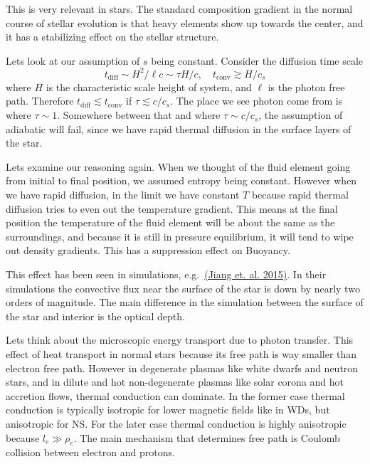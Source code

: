 \documentclass[letterpaper, 11pt]{article}
\numberwithin{equation}{section}
\numberwithin{figure}{section}
\begin{document}
This is very relevant in stars. The standard composition gradient in the normal
course of stellar evolution is that heavy elements show up towards the center,
and it has a stabilizing effect on the stellar structure.

Lets look at our assumption of $s$ being constant. Consider the diffusion time
scale
\begin{equation}
  \label{eq:28}
  t_\mathrm{diff} \sim H^2/\ell c \sim \tau H/c, \quad t_\mathrm{conv} \gtrsim H/c_s
\end{equation}
where $H$ is the characteristic scale height of system, and $\ell$ is the photon
free path. Therefore $t_\mathrm{diff} \lesssim t_\mathrm{conv}$ if $\tau
\lesssim c/c_{s}$. The place we see photon come from is where $\tau\sim 1$.
Somewhere between that and where $\tau \sim c/c_{s}$, the assumption of
adiabatic will fail, since we have rapid thermal diffusion in the surface layers
of the star.

Lets examine our reasoning again. When we thought of the fluid element going from
initial to final position, we assumed entropy being constant. However when we
have rapid diffusion, in the limit we have constant $T$ because rapid thermal
diffusion tries to even out the temperature gradient. This means at the final
position the temperature of the fluid element will be about the same as the
surroundings, and because it is still in pressure equilibrium, it will tend to
wipe out density gradients. This has a suppression effect on Buoyancy.

This effect has been seen in simulations, e.g.\
\href{http://arxiv.org/abs/1509.05417}{(Jiang et. al. 2015)}. In their
simulations the convective flux near the surface of the star is down by nearly
two orders of magnitude. The main difference in the simulation between the
surface of the star and interior is the optical depth.

Lets think about the microscopic energy transport due to photon transfer. This
effect of heat transport in normal stars because its free path is way
smaller than electron free path. However in degenerate plasmas like white dwarfs
and neutron stars, and in dilute and hot non-degenerate plasmas like solar
corona and hot accretion flows, thermal conduction can dominate. In the former
case thermal conduction is typically isotropic for lower magnetic fields like in
WDs, but anisotropic for NS. For the later case thermal conduction is highly
anisotropic because $l_{e}\gg \rho_{e}$. The main mechanism that determines free
path is Coulomb collision between electron and protons.
\end{document}
